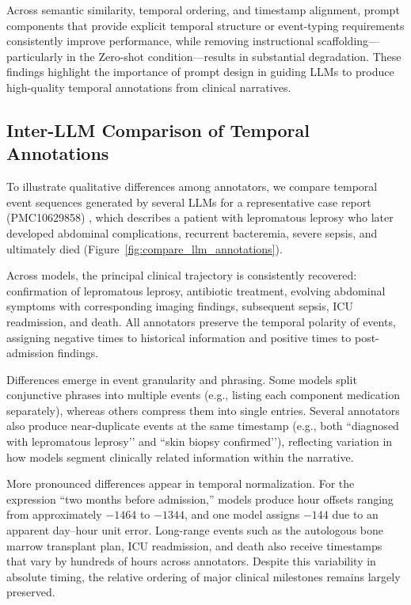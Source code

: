 Across semantic similarity, temporal ordering, and timestamp alignment, prompt components that provide explicit temporal structure or event-typing requirements consistently improve
performance, while removing instructional scaffolding—particularly in the Zero-shot condition—results in substantial degradation. These findings highlight the importance of prompt
design in guiding LLMs to produce high-quality temporal annotations from clinical narratives.


\subsection{Inter-LLM Comparison of Temporal Annotations} 
\label{apd:inter-llm-comparison}

To illustrate qualitative differences among annotators, we compare temporal event sequences generated by several LLMs for a representative case report (PMC10629858) \citep{abu2023rare}, which describes a patient with lepromatous leprosy who later developed abdominal complications, recurrent bacteremia, severe sepsis, and ultimately died (Figure~\ref{fig:compare_llm_annotations}).



Across models, the principal clinical trajectory is consistently recovered: confirmation of lepromatous leprosy, antibiotic treatment, evolving abdominal symptoms with corresponding imaging findings, subsequent sepsis, ICU readmission, and death. All annotators preserve the
temporal polarity of events, assigning negative times to historical information and positive times to post-admission findings.

Differences emerge in event granularity and phrasing. Some models split conjunctive phrases into multiple events (e.g., listing each component medication separately), whereas others
compress them into single entries. Several annotators also produce near-duplicate events at the same timestamp (e.g., both “diagnosed with lepromatous leprosy’’ and “skin biopsy confirmed’’), reflecting variation in how models segment clinically related information within the narrative.

More pronounced differences appear in temporal normalization. For the expression “two months before admission,” models produce hour offsets ranging from approximately $-1464$ to $-1344$, and one model assigns $-144$ due to an apparent day–hour unit error. Long-range events such as the autologous bone marrow transplant plan, ICU readmission, and death also receive timestamps that vary by hundreds of hours across annotators. Despite this variability in absolute timing,
the relative ordering of major clinical milestones remains largely preserved.


